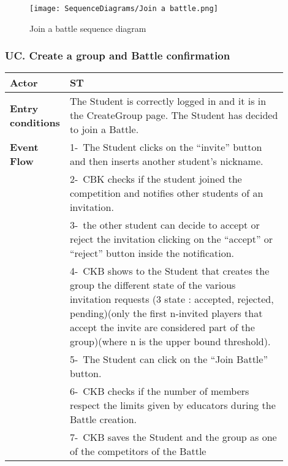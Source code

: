 \begin{figure}[H]
    \begin{center}
        \texttt{[image: SequenceDiagrams/Join a battle.png]}
        \caption{Join a battle sequence diagram}
        \label{fig:join_a_battle_seqd}%
    \end{center}
\end{figure}

\subsubsection*{UC\cuc . Create a group and Battle confirmation}
\begin{center}
    \begin{longtable}{|l|p{0.9\linewidth}|}
        \hline
        \textbf{Actor}            & ST                                                                                                                                                                                        \\
        \hline
        \textbf{Entry conditions} & The Student is correctly logged in and it is in the CreateGroup page. The Student has decided to join a Battle.        \\
        \hline
        \textbf{Event Flow}       & 1-\ The Student clicks on the “invite” button and then inserts another student’s nickname.        \\
        & 2-\ CBK checks if the student joined the competition and notifies other students of an invitation.          \\
        & 3-\ the other student can decide to accept or reject the invitation clicking on the “accept” or “reject” button inside the notification.        \\
        & 4-\ CKB shows to the Student that creates the group the different state of the various invitation requests (3 state : accepted, rejected, pending)(only the first n-invited players that accept the invite are considered part of the group)(where n is the upper bound threshold).         \\
        & 5-\ The Student can click on the “Join Battle” button.        \\
        & 6-\ CKB checks if the number of members respect the limits given by educators during the Battle creation.         \\
        & 7-\ CKB saves the Student and the group as one of the competitors of the Battle        \\

\end{longtable}
\end{center}
